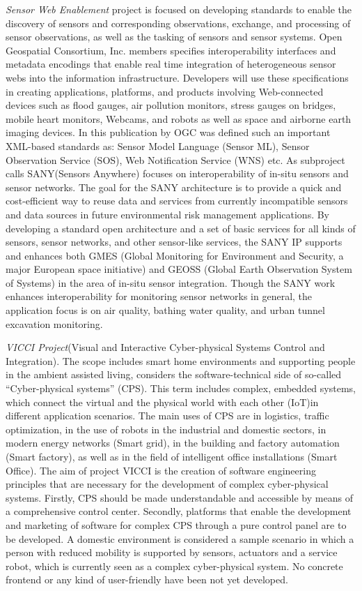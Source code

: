 	\emph{Sensor Web Enablement} project\cite{ogc} is focused on developing standards to enable the discovery of sensors and corresponding observations, exchange, and processing of sensor observations, as well as the tasking of sensors and sensor systems.
	 Open Geospatial Consortium, Inc. members specifies interoperability interfaces and metadata encodings that enable real time integration of heterogeneous sensor webs into the information infrastructure. Developers will use these specifications in creating applications, platforms, and products involving Web-connected devices such as flood gauges, air pollution monitors, stress gauges on bridges, mobile heart monitors, Webcams, and robots as well as space and airborne earth imaging devices. In this publication by OGC was defined such an important XML-based standards as: Sensor Model Language (Sensor ML), Sensor Observation Service (SOS), Web Notification Service (WNS) etc. As subproject calls SANY(Sensors Anywhere) focuses on interoperability of in-situ sensors and sensor networks. The goal for the SANY architecture is to provide a quick and cost-efficient way to reuse data and services from currently incompatible sensors and data sources in future environmental risk management applications. By developing a standard open architecture and a set of basic services for all kinds of sensors, sensor networks, and other sensor-like services, the SANY IP supports and enhances both GMES (Global Monitoring for Environment and Security, a major European space initiative) and GEOSS (Global Earth Observation System of Systems) in the area of in-situ sensor integration. Though the SANY work enhances interoperability for monitoring sensor networks in general, the application focus is on air quality, bathing water quality, and urban tunnel excavation monitoring.
 
    \emph{VICCI Project}(Visual and Interactive Cyber-physical Systems Control and Integration)\cite{vicci,6548811}. The scope includes smart home environments and supporting people in the ambient assisted living, considers the software-technical side of so-called “Cyber-physical systems” (CPS). This term includes complex, embedded systems, which connect the virtual and the physical world with each other (IoT)in different application scenarios. The main uses of CPS are in logistics, traffic optimization, in the use of robots in the industrial and domestic sectors, in modern energy networks (Smart grid), in the building and factory automation (Smart factory), as well as in the field of intelligent office installations (Smart Office). The aim of project VICCI is the creation of software engineering principles that are necessary for the development of complex cyber-physical systems. Firstly, CPS should be made understandable and accessible by means of a comprehensive control center. Secondly, platforms that enable the development and marketing of software for complex CPS through a pure control panel are to be developed. A domestic environment is considered a sample scenario in which a person with reduced mobility is supported by sensors, actuators and a service robot, which is currently seen as a complex cyber-physical system. No concrete frontend or any kind of user-friendly have been not yet developed. 

